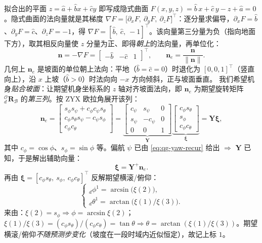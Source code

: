 拟合出的平面 $z=\hat a+\hat b x+\hat c y$ 即写成隐式曲面 $F(x,y,z)=\hat b\,x+\hat c\,y-z+\hat a=0$。隐式曲面的法向量就是其梯度 $\nabla F=\big[\partial_x F,\ \partial_y F,\ \partial_z F\big]^\top$：逐分量求偏导，$\partial_x F=\hat b$、$\partial_y F=\hat c$、$\partial_z F=-1$，得 $\nabla F=[\hat b,\ \hat c,\ -1]^\top$。该向量第三分量为负（指向地面下方），取其相反向量使 $z$ 分量为正、即得\emph{朝上}的法向量，再单位化\cite{yu2021quadruped}：
\begin{equation}
  \boldsymbol{n}=-\nabla F=\begin{bmatrix}-\hat b & -\hat c & 1\end{bmatrix}^\top,
  \qquad
  \boldsymbol{n}_e=\frac{\boldsymbol{n}}{\|\boldsymbol{n}\|}.
  \label{eq:qg-normal}
\end{equation}
几何上 $\boldsymbol n_e$ 是坡面的单位朝上法向：平地（$\hat b=\hat c=0$）时退化为 $[0,0,1]^\top$（竖直向上），沿 $x$ 上坡（$\hat b>0$）时法向向 $-x$ 方向倾斜，正与坡面垂直。
我们希望机身\emph{贴合坡面}：让期望机身坐标系的 $z$ 轴对齐坡面法向，即 $\boldsymbol{n}_e$ 为期望旋转矩阵 ${}_d^{\mathcal{O}}\mathbf{R}_{\mathcal{B}}$ 的\emph{第三列}。按 ZYX 欧拉角展开该列\cite{yu2021quadruped}：
\begin{equation}
  \boldsymbol{n}_e=
  \begin{bmatrix}
  s_\phi s_\psi+c_\phi c_\psi s_\theta \\
  c_\phi s_\theta s_\psi-c_\psi s_\phi \\
  c_\phi c_\theta
  \end{bmatrix}
  =\underbrace{\begin{bmatrix} c_\psi & s_\psi & 0 \\ s_\psi & -c_\psi & 0 \\ 0 & 0 & 1\end{bmatrix}}_{\mathbf{Y}}
  \underbrace{\begin{bmatrix} c_\phi s_\theta \\ s_\phi \\ c_\phi c_\theta\end{bmatrix}}_{\boldsymbol{\xi}}
  =\mathbf{Y}\boldsymbol{\xi},
  \label{eq:qg-ne-decomp}
\end{equation}
其中 $c_\phi=\cos\phi$、$s_\phi=\sin\phi$ 等。偏航 $\psi$ 已由 \cref{eq:qg-yaw-recur} 给出 $\Rightarrow$ $\mathbf{Y}$ 已知，于是解出辅助向量\cite{yu2021quadruped}：
\begin{equation}
  \boldsymbol{\xi}=\mathbf{Y}^{+}\boldsymbol{n}_e.
  \label{eq:qg-xi}
\end{equation}
再由 $\boldsymbol{\xi}=[c_\phi s_\theta,\ s_\phi,\ c_\phi c_\theta]^\top$ 反解期望横滚/俯仰\cite{yu2021quadruped}：
\begin{equation}
  \begin{cases}
  {}_d\phi^{1}=\arcsin\big(\xi(2)\big),\\
  {}_d\theta^{1}=\arctan\big(\xi(1)/\xi(3)\big).
  \end{cases}
  \label{eq:qg-pitch-roll}
\end{equation}
来由：$\xi(2)=s_\phi\Rightarrow\phi=\arcsin\xi(2)$；$\xi(1)/\xi(3)=(c_\phi s_\theta)/(c_\phi c_\theta)=\tan\theta\Rightarrow\theta=\arctan(\xi(1)/\xi(3))$。期望横滚/俯仰\emph{不随预测步变化}（坡度在一段时域内近似恒定），故记上标 $1$。

